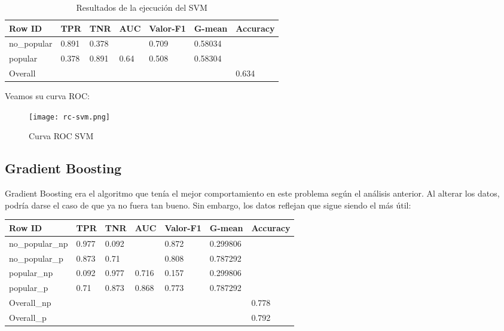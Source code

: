 \begin{table}[H]
	\centering
	\begin{tabular}{|l|l|l|l|l|l|l|}
		\hline
		Row ID      & TPR   & TNR   & AUC   & Valor-F1 & G-mean   & Accuracy \\ \hline
		no\_popular & 0.891 & 0.378 &       & 0.709     & 0.58034 &          \\ \hline
		popular     & 0.378 & 0.891 & 0.64 & 0.508    & 0.58304 &          \\ \hline
		Overall     &       &       &       &          &          & 0.634    \\ \hline
	\end{tabular}
	\caption{Resultados de la ejecución del SVM}
	\label{tab:svm}
\end{table}
	
Veamos su curva ROC:
	
\begin{figure}[H] %
	\centering
	\texttt{[image: rc-svm.png]}  %
	\caption{Curva ROC SVM} 
	\label{fig:rocsvm}
\end{figure}

\subsection{Gradient Boosting}

Gradient Boosting era el algoritmo que tenía el mejor comportamiento en este problema según el análisis anterior. Al alterar los datos, podría darse el caso de que ya no fuera tan bueno. Sin embargo, los datos reflejan que sigue siendo el más útil:

\begin{table}[H]
	\centering
	\begin{tabular}{|l|l|l|l|l|l|l|}
		\hline
		Row ID          & TPR   & TNR   & AUC   & Valor-F1 & G-mean   & Accuracy \\ \hline
		no\_popular\_np & 0.977 & 0.092 &       & 0.872    & 0.299806 &          \\ \hline
		no\_popular\_p  & 0.873 & 0.71  &       & 0.808    & 0.787292 &          \\ \hline
		popular\_np     & 0.092 & 0.977 & 0.716 & 0.157    & 0.299806 &          \\ \hline
		popular\_p      & 0.71  & 0.873 & 0.868 & 0.773    & 0.787292 &          \\ \hline
		Overall\_np     &       &       &       &          &          & 0.778    \\ \hline
		Overall\_p      &       &       &       &          &          & 0.792    \\ \hline
	\end{tabular}
\end{table}

